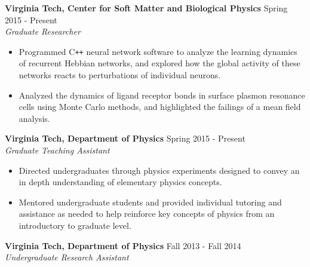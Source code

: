 \documentclass[10pt]{letter}
\begin{document}

 {\bf Virginia Tech,  Center for Soft Matter and Biological Physics} \hfill Spring 2015 - Present\\
{\sl Graduate Researcher}
\vspace{-.25cm}


\begin{itemize}%

\item Programmed C\texttt{++} neural network software to analyze the learning dynamics of recurrent Hebbian networks, and explored how the global activity of these networks reacts to perturbations of individual neurons. 

\item Analyzed the dynamics of ligand receptor bonds in surface plasmon resonance cells using Monte Carlo methods, and highlighted the failings of a mean field analysis.

\end{itemize}




\vspace{.25cm}
 {\bf Virginia Tech,  Department of Physics} \hfill Spring 2015 - Present\\
{\sl Graduate Teaching Assistant}
\vspace{-.25cm}


\begin{itemize} %
\item Directed undergraduates through physics experiments designed to convey an in depth understanding of elementary physics concepts.
\item Mentored undergraduate students and provided individual tutoring and assistance as needed to help reinforce key concepts of physics from an introductory to graduate level.
\end{itemize}

\vspace{.25cm}



\vspace{.25cm}
 {\bf Virginia Tech,  Department of Physics} \hfill Fall 2013 - Fall 2014\\
 {\sl Undergraduate Research Assistant}
\vspace{-.25cm}
\end{document}
